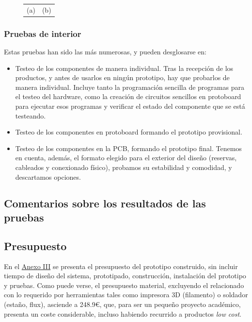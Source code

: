 \documentclass[12pt]{article}
\begin{document}
\begin{figure}[h!]
\begin{center}
\begin{tabular}{cc}
				(a)  & (b) \\[6pt]
			\end{tabular}
			\caption{}
			\label{captura web prueba cobertura}
		\end{center}
	\end{figure}

	\subsubsection{Pruebas de interior}
	
	\noindent Estas pruebas han sido las más numerosas, y pueden desglosarse en: \\
	
	\begin{itemize}
		\item Testeo de los componentes de manera individual. Tras la recepción de los productos, y antes de usarlos en ningún prototipo, hay que probarlos de manera individual. Incluye tanto la programación sencilla de programas para el testeo del hardware, como la creación de circuitos sencillos en protoboard para ejecutar esos programas y verificar el estado del componente que se está testeando.
		\item Testeo de los componentes en protoboard formando el prototipo provisional.
		\item Testeo de los componentes en la PCB, formando el prototipo final. Tenemos en cuenta, además, el formato elegido para el exterior del diseño (reservas, cableados y conexionado físico), probamos su estabilidad y comodidad, y descartamos opciones.
	\end{itemize}
	
	\pagebreak
	
	\subsection[Comentarios sobre los resultados de las pruebas]{Comentarios sobre los resultados de las pruebas}
	
	\noindent 
	
	\pagebreak
	
	\subsection[Presupuesto]{Presupuesto}

	\noindent En el \hyperref[anexo III: presupuesto]{Anexo III} se presenta el presupuesto del prototipo construido, sin incluir tiempo de diseño del sistema, prototipado, construcción, instalación del prototipo y pruebas. Como puede verse, el presupuesto material, excluyendo el relacionado con lo requerido por herramientas tales como impresora 3D (filamento) o soldador (estaño, flux), asciende a 248.9\euro, que, para ser un pequeño proyecto académico, presenta un coste considerable, incluso habiendo recurrido a productos \textit{low cost}. \\
	
\end{document}
